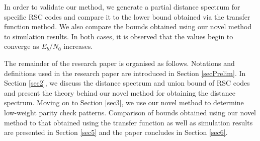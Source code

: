 In order to validate our method, we generate a partial distance spectrum for specific RSC codes and compare it to the lower bound obtained via the transfer function method. We also compare the bounds obtained using our novel method to simulation results. In both cases, it is observed that the values begin to converge as $E_b/N_0$ increases.

The remainder of the research paper is organised as follows. Notations and definitions used in the research paper are introduced in Section \ref{secPrelim}. In Section \ref{sec2}, we discuss the distance spectrum and union bound of RSC codes and present the theory behind our novel method for obtaining the distance spectrum. Moving on to Section \ref{sec3}, we use our novel method to determine low-weight parity check patterns. Comparison of bounds obtained using our novel method to that obtained using the transfer function as well as  simulation results are presented in Section \ref{sec5} and the paper concludes in Section \ref{sec6}.